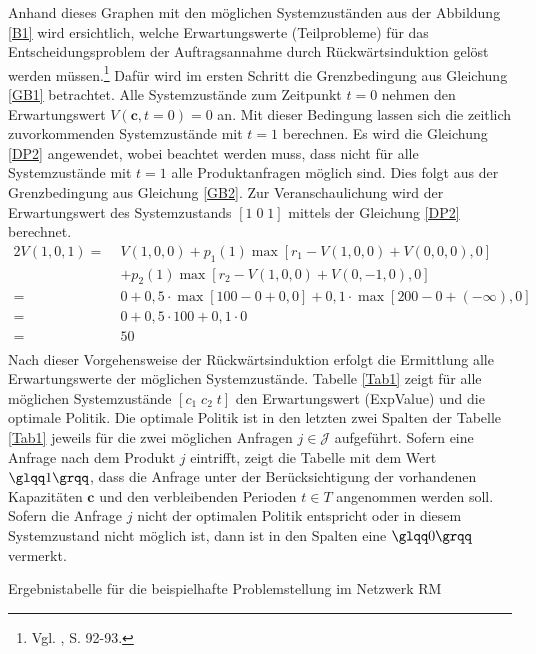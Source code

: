 Anhand dieses Graphen mit den möglichen Systemzuständen aus der Abbildung \ref{B1} wird ersichtlich, welche Erwartungswerte (Teilprobleme) für das Entscheidungsproblem der Auftragsannahme durch Rückwärtsinduktion gelöst werden müssen.\footnote{Vgl. \cite{puterman2009markov}, S. 92-93.} Dafür wird im ersten Schritt die Grenzbedingung aus Gleichung \eqref{GB1} betrachtet. Alle Systemzustände zum Zeitpunkt $t=0$ nehmen den Erwartungswert $V(\textbf{c}, t=0)=0$ an. Mit dieser Bedingung lassen sich die zeitlich zuvorkommenden Systemzustände mit $t=1$ berechnen. Es wird die Gleichung \eqref{DP2} angewendet, wobei beachtet werden muss, dass nicht für alle Systemzustände mit $t=1$ alle Produktanfragen möglich sind. Dies folgt aus der Grenzbedingung aus Gleichung \eqref{GB2}. Zur Veranschaulichung wird der Erwartungswert des Systemzustands $[1\;0\;1]$ mittels der Gleichung \eqref{DP2} berechnet.
\begin{alignat*}{2}
V(1,0,1)=\;&V(1,0,0)+p_{1}(1)\max[r_{1}-V(1,0,0)+V(0,0,0),0]\\
&+p_{2}(1)\max[r_{2}-V(1,0,0)+V(0,-1,0),0]\\
=\;&0+0,5\cdot\max[100-0+0,0]+0,1\cdot\max[200-0+(-\infty),0]\\
=\;&0+0,5\cdot 100+0,1\cdot0\\
=\;&50\\
\end{alignat*}
Nach dieser Vorgehensweise der Rückwärtsinduktion erfolgt die Ermittlung alle Erwartungswerte der möglichen Systemzustände. Tabelle \ref{Tab1} zeigt für alle möglichen Systemzustände $[c_1\;c_2\;t]$ den Erwartungswert (ExpValue) und die optimale Politik. Die optimale Politik ist in den letzten zwei Spalten der Tabelle \ref{Tab1} jeweils für die zwei möglichen Anfragen $j\in\mathcal{J}$ aufgeführt. Sofern eine Anfrage nach dem Produkt $j$ eintrifft, zeigt die Tabelle mit dem Wert $\glqq 1\grqq$, dass die Anfrage unter der Berücksichtigung der vorhandenen Kapazitäten $\textbf{c}$ und den verbleibenden Perioden $t\in T$ angenommen werden soll. Sofern die Anfrage $j$ nicht der optimalen Politik entspricht oder in diesem Systemzustand nicht möglich ist, dann ist in den Spalten eine $\glqq 0\grqq$ vermerkt.
\begin{table}
\begin{footnotesize}
    \caption{Ergebnistabelle für die beispielhafte Problemstellung im Netzwerk RM} \label{Tab1}
    \vspace*{3mm}
    \begin{center}
            \end{center}
\end{footnotesize}
\end{table}

